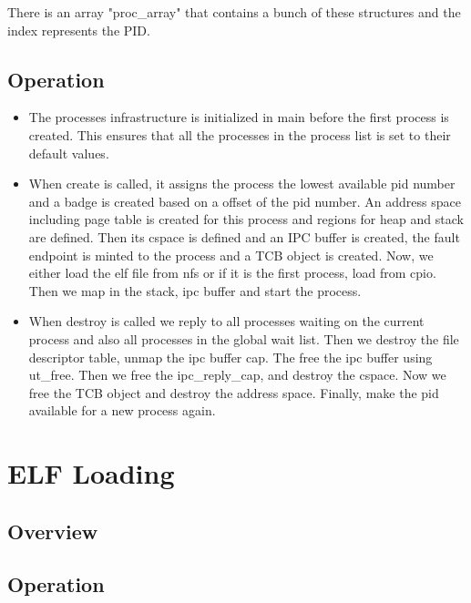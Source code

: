 \documentclass[12pt]{article}
\begin{document}
There is an array "proc\_array" that contains a bunch of these structures and the index represents the PID.
\subsection{Operation}
\begin{itemize}
\item The processes infrastructure is initialized in main before the first process is created. This ensures that all the processes in the process list is set to their default values. 

\item When create is called, it assigns the process the lowest available pid number and a badge is created based on a offset of the pid number. An address space including page table is created for this process and regions for heap and stack are defined. Then its cspace is defined and an IPC buffer is created, the fault endpoint is minted to the process and a TCB object is created. Now, we either load the elf file from nfs or if it is the first process, load from cpio. Then we map in the stack, ipc buffer and start the process.

\item When destroy is called we reply to all processes waiting on the current process and also all processes in the global wait list. Then we destroy the file descriptor table, unmap the ipc buffer cap. The free the ipc buffer using ut\_free. Then we free the ipc\_reply\_cap, and destroy the cspace. Now we free the TCB object and destroy the address space. Finally, make the pid available for a new process again.
\end{itemize}
\clearpage
\section{ELF Loading}
\subsection{Overview}
\subsection{Operation}
\end{document}
